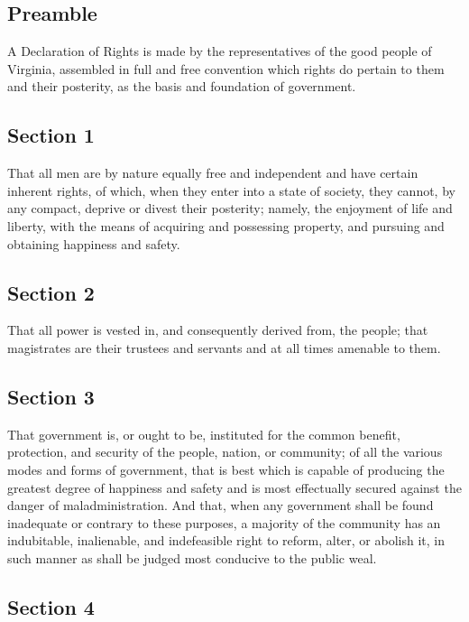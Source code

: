 \documentclass[11pt,a4paper]{article}
\begin{document}
\subsection*{Preamble}

A Declaration of Rights is made by the representatives of the good people of Virginia, assembled in full and free convention which rights do pertain to them and their posterity, as the basis and foundation of government.

\subsection*{Section 1}

That all men are by nature equally free and independent and have certain inherent rights, of which, when they enter into a state of society, they cannot, by any compact, deprive or divest their posterity; namely, the enjoyment of life and liberty, with the means of acquiring and possessing property, and pursuing and obtaining happiness and safety.

\subsection*{Section 2}

That all power is vested in, and consequently derived from, the people; that magistrates are their trustees and servants and at all times amenable to them.

\subsection*{Section 3}

That government is, or ought to be, instituted for the common benefit, protection, and security of the people, nation, or community; of all the various modes and forms of government, that is best which is capable of producing the greatest degree of happiness and safety and is most effectually secured against the danger of maladministration.
And that, when any government shall be found inadequate or contrary to these purposes, a majority of the community has an indubitable, inalienable, and indefeasible right to reform, alter, or abolish it, in such manner as shall be judged most conducive to the public weal.

\subsection*{Section 4}
\end{document}
